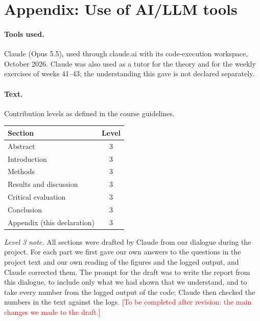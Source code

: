 
\appendix

\section*{Appendix: Use of AI/LLM tools}

\paragraph*{Tools used.} Claude (Opus 5.5), used through claude.ai with its code-execution workspace, October 2026. Claude was also used as a tutor for the theory and for the weekly exercises of weeks 41--43; the understanding this gave is not declared separately.

\paragraph*{Text.} Contribution levels as defined in the course guidelines.

\begin{center}
    \begin{tabular}{lc}
        \toprule
        Section & Level \\
        \midrule
        Abstract & 3 \\
        Introduction & 3 \\
        Methods & 3 \\
        Results and discussion & 3 \\
        Critical evaluation & 3 \\
        Conclusion & 3 \\
        Appendix (this declaration) & 3 \\
        \bottomrule
    \end{tabular}
\end{center}

\emph{Level 3 note.} All sections were drafted by Claude from our dialogue during the project. For each part we first gave our own answers to the questions in the project text and our own reading of the figures and the logged output, and Claude corrected them. The prompt for the draft was to write the report from this dialogue, to include only what we had shown that we understand, and to take every number from the logged output of the code; Claude then checked the numbers in the text against the logs. \textcolor{red}{[To be completed after revision: the main changes we made to the draft.]}


